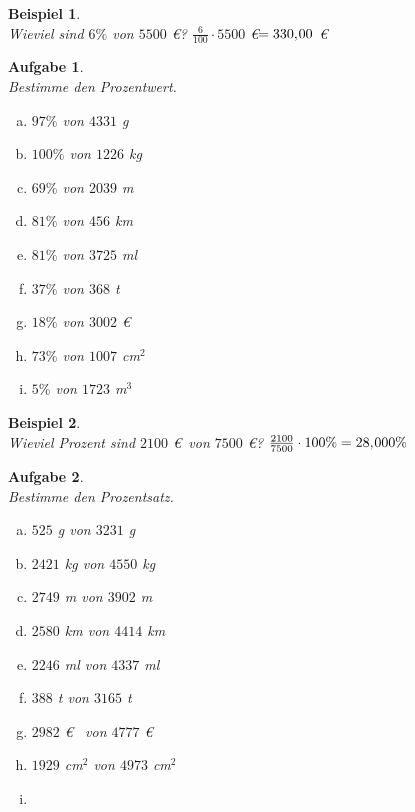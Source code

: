 \documentclass[12pt,fleqn]{article}
\theoremstyle{aufg}
\newtheorem{aufgabe}{Aufgabe}
\theoremstyle{bsp}
\newtheorem{beispiel}{Beispiel}
\begin{document}
 
    \begin{flushleft}
\begin{beispiel} ~ \\ 
Wieviel sind $6\%$ von $5500$ \euro? $\frac{6}{100}\cdot 5500$ \euro $ = 330,\hspace{-1pt}00$ \euro\end{beispiel} 
\begin{aufgabe} ~ \\ 
Bestimme den Prozentwert.\begin{multicols}{3} 
\begin{enumerate}[a)] 
\item 
$97\%$ von $4331$ g
\item 
$100\%$ von $1226$ kg
\item 
$69\%$ von $2039$ m
\item 
$81\%$ von $456$ km
\item 
$81\%$ von $3725$ ml
\item 
$37\%$ von $368$ t
\item 
$18\%$ von $3002$ \euro~
\item 
$73\%$ von $1007$ cm$^2$
\item 
$5\%$ von $1723$ m$^3$
\end{enumerate} 
\end{multicols} 
\end{aufgabe} 
\begin{beispiel} ~ \\ 
Wieviel Prozent sind $2100$ \euro~von $7500$ \euro? $\frac{2100}{7500}\cdot 100\%  = 28,\hspace{-1pt}000\%$ \end{beispiel} 
\begin{aufgabe} ~ \\ 
Bestimme den Prozentsatz.\begin{multicols}{3} 
\begin{enumerate}[a)] 
\item 
$525$ g von $3231$ g
\item 
$2421$ kg von $4550$ kg
\item 
$2749$ m von $3902$ m
\item 
$2580$ km von $4414$ km
\item 
$2246$ ml von $4337$ ml
\item 
$388$ t von $3165$ t
\item 
$2982$ \euro~ von $4777$ \euro~
\item 
$1929$ cm$^2$ von $4973$ cm$^2$
\item 

\end{enumerate}
\end{multicols}
\end{aufgabe}
\end{flushleft}
\end{document}
